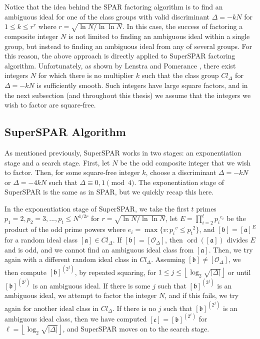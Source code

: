\documentclass{ucalgthes1}
\theoremstyle{definition}
\DeclareMathOperator{\ord}{ord}
\newcommand{\floor}[1]{\left\lfloor #1 \right\rfloor}
\newcommand{\ideal}{\mathfrak}
\newcommand{\idealclass}[1]{\left[ \ideal #1 \right]}
\newcommand{\aclass}{\idealclass a}
\newcommand{\bclass}{\idealclass b}
\newcommand{\cclass}{\idealclass c}
\newcommand{\idclass}{[\mathcal O_\Delta]}
\begin{document}
Notice that the idea behind the SPAR factoring algorithm is to find an ambiguous ideal for one of the class groups with valid discriminant $\Delta = -kN$ for $1 \le k \le r^r$ where $r = \sqrt{\ln N / \ln \ln N}$.  In this case, the success of factoring a composite integer $N$ is not limited to finding an ambiguous ideal within a single group, but instead to finding an ambiguous ideal from any of several groups.  For this reason, the above approach is directly applied to SuperSPAR factoring algorithm.  Unfortunately, as shown by Lenstra and Pomerance \mbox{\cite[\S~11]{Lenstra1992}}, there exist integers $N$ for which there is no multiplier $k$ such that the class group $Cl_\Delta$ for $\Delta = -kN$ is sufficiently smooth.  Such integers have large square factors, and in the next subsection (and throughout this thesis) we assume that the integers we wish to factor are square-free.


\subsection{SuperSPAR Algorithm}
\label{subsec:ssparAlg}

As mentioned previously, SuperSPAR works in two stages: an exponentiation stage and a search stage.  First, let $N$ be the odd composite integer that we wish to factor.  Then, for some square-free integer $k$, choose a discriminant $\Delta = -kN$ or $\Delta = -4kN$ such that $\Delta \equiv 0, 1 \pmod 4$.  The exponentiation stage of SuperSPAR is the same as in SPAR, but we quickly recap this here.

In the exponentiation stage of SuperSPAR, we take the first $t$ primes $p_1 = 2, p_2 = 3, ..., p_t \le N^{1/2r}$ for $r = \sqrt{\ln N / \ln \ln N}$, let $E = \prod_{i=2}^t {p_i}^{e_i}$ be the product of the odd prime powers where $e_i = \max \{ v : {p_i}^v \le {p_t}^2 \}$, and $\bclass = \aclass^E$ for a random ideal class $\aclass \in Cl_\Delta$.  If $\bclass = \idclass$, then $\ord(\aclass)$ divides $E$ and is odd, and we cannot find an ambiguous ideal class from $\aclass$.  Then, we try again with a different random ideal class in $Cl_\Delta$.  Assuming $\bclass \neq \idclass$, we then compute $\bclass^{\left(2^j\right)}$, by repeated squaring, for $1 \le j \le \floor{\log_2\sqrt{|\Delta|}}$ or until $\bclass^{\left(2^j\right)}$ is an ambiguous ideal.  If there is some $j$ such that $\bclass^{\left(2^j\right)}$ is an ambiguous ideal, we attempt to factor the integer $N$, and if this fails, we try again for another ideal class in $Cl_\Delta$.  If there is no $j$ such that $\bclass^{\left(2^j\right)}$ is an ambiguous ideal class, then we have computed $\cclass = {\bclass}^{\left(2^\ell\right)}$ for $\ell=\floor{\log_2 \sqrt{|\Delta|}}$, and SuperSPAR moves on to the search stage.
\end{document}
